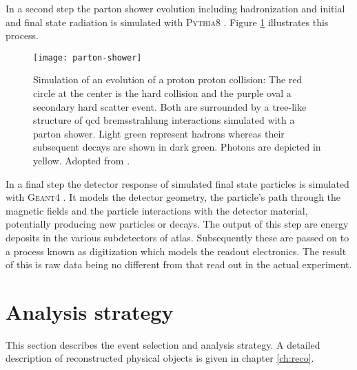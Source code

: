 In a second step the parton shower evolution including hadronization and initial and final state radiation is simulated with \textsc{Pythia8} \citep{Sjostrand:2014zea}. Figure \ref{fig:parton_shower} illustrates this process.
\begin{figure}[]
    \centering
    \texttt{[image: parton-shower]}
    \caption{Simulation of an evolution of a proton proton collision: The red circle at the center is the hard collision and the purple oval a secondary hard scatter event. Both are surrounded by a tree-like structure of \ac{qcd} bremsstrahlung interactions simulated with a parton shower. Light green represent hadrons whereas their subsequent decays are shown in dark green. Photons are depicted in yellow. Adopted from \citep{Hoche:2014rga}.
        \label{fig:parton_shower}}
\end{figure}

In a final step the detector response of simulated final state particles is simulated with \textsc{Geant}4 \citep{Agostinelli:2002hh}. It models the detector geometry, the particle's path through the magnetic fields and the particle interactions with the detector material, potentially producing new particles or decays. The output of this step are energy deposits in the various subdetectors of \ac{atlas}. Subsequently these are passed on to a process known as digitization which models the readout electronics. The result of this is raw data being no different from that read out in the actual experiment.

\section{Analysis strategy}
This section describes the event selection and analysis strategy. A detailed description of reconstructed physical objects is given in chapter \ref{ch:reco}.

